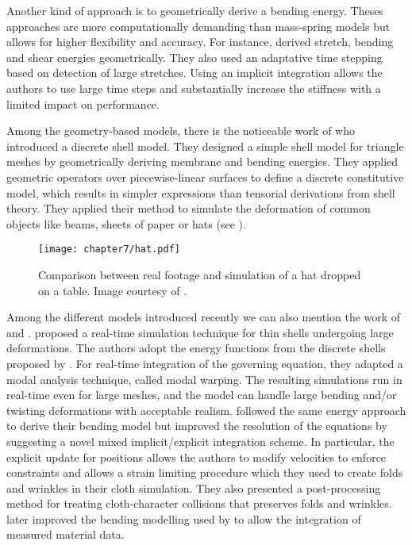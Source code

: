 Another kind of approach is to geometrically derive a bending energy. Theses approaches are more computationally demanding than mass-spring models but allows for higher flexibility and accuracy. For instance, \cite{Baraff98} derived stretch, bending and shear energies geometrically. They also used an adaptative time stepping based on detection of large stretches. Using an implicit integration allows the authors to use large time steps and substantially increase the stiffness with a limited impact on performance. 

Among the geometry-based models, there is the noticeable work of \cite{Grinspun03} who introduced a discrete shell model. They designed a simple shell model for triangle meshes by geometrically deriving membrane and bending energies. They applied geometric operators over piecewise-linear surfaces to define a discrete constitutive model, which results in simpler expressions than tensorial derivations from shell theory. They applied their method to simulate the deformation of common objects like beams, sheets of paper or hats (see ). 
%
\begin{figure}[ht]
\begin{center}
\texttt{[image: chapter7/hat.pdf]}
\caption[Comparison between real footage and simulation of a hat dropped on a table]{Comparison between real footage and simulation of a hat dropped on a table. Image courtesy of \cite{Grinspun03}.}
\label{chap7:fig-hat}
\end{center}
\end{figure}

Among the different models introduced recently we can also mention the work of \cite{Choi07} and \cite{Bridson03}. \citeauthor{Choi07}  proposed a real-time simulation technique for thin shells undergoing large deformations. The authors adopt the energy functions from the discrete shells proposed by \cite{Grinspun03}. For real-time integration of the governing equation, they adapted a modal analysis technique, called modal warping. The resulting simulations run in real-time even for large meshes, and the model can handle large bending and/or twisting deformations with acceptable realism. \citeauthor{Bridson03} followed the same energy approach to derive their bending model but improved the resolution of the equations by suggesting a novel mixed implicit/explicit integration scheme. In particular, the explicit update for positions allows the authors to modify velocities to enforce constraints and allows a strain limiting procedure which they used to create folds and wrinkles in their cloth simulation. They also presented a post-processing method for treating cloth-character collisions that preserves folds and wrinkles. \cite{Pabst08} later improved the bending modelling used by \citeauthor{Bridson03} to allow the integration of measured material data. 

